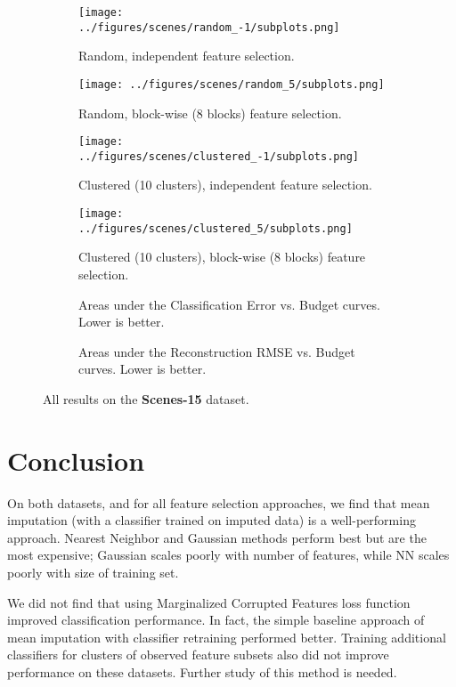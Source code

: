 \begin{figure}[ht!]
    \centering
    \begin{subfigure}[b]{\textwidth}
        \centering
        \texttt{[image: ../figures/scenes/random\_-1/subplots.png]}
        \caption{Random, independent feature selection.\vspace{.2cm}}
    \end{subfigure}
    \begin{subfigure}[b]{\textwidth}
        \centering
        \texttt{[image: ../figures/scenes/random\_5/subplots.png]}
        \caption{Random, block-wise (8 blocks) feature selection.\vspace{.2cm}}
    \end{subfigure}
    \begin{subfigure}[b]{\textwidth}
        \centering
        \texttt{[image: ../figures/scenes/clustered\_-1/subplots.png]}
        \caption{Clustered (10 clusters), independent feature selection.\vspace{.2cm}}
    \end{subfigure}
    \begin{subfigure}[b]{\textwidth}
        \centering
        \texttt{[image: ../figures/scenes/clustered\_5/subplots.png]}
        \caption{Clustered (10 clusters), block-wise (8 blocks) feature selection.\vspace{.2cm}}
    \end{subfigure}

    \small{
    \begin{subfigure}[b]{1\textwidth}
        \centering
        
        \caption{Areas under the Classification Error vs. Budget curves. Lower is better.}
    \end{subfigure}
    \begin{subfigure}[b]{1\textwidth}
        \centering
        
        \caption{Areas under the Reconstruction RMSE vs. Budget curves. Lower is better.}
    \end{subfigure}
    }
    \caption{All results on the \textbf{Scenes-15} dataset.}
    \label{fig:scenes}
\end{figure}

\section{Conclusion}

On both datasets, and for all feature selection approaches, we find that mean imputation (with a classifier trained on imputed data) is a well-performing approach.
Nearest Neighbor and Gaussian methods perform best but are the most expensive; Gaussian scales poorly with number of features, while NN scales poorly with size of training set.

We did not find that using Marginalized Corrupted Features loss function improved classification performance.
In fact, the simple baseline approach of mean imputation with classifier retraining performed better.
Training additional classifiers for clusters of observed feature subsets also did not improve performance on these datasets.
Further study of this method is needed.
